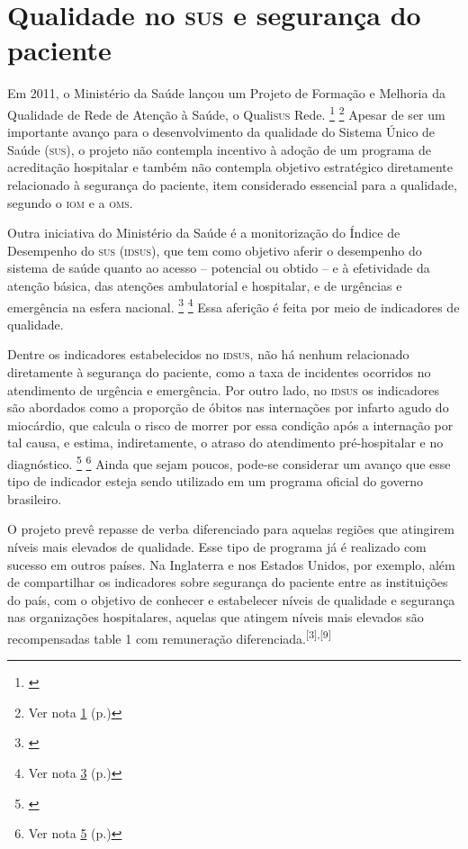 \documentclass{article}
\newcounter{fn1}
\newcounter{fn2}
\newcounter{fn3}
\newcounter{fn4}
\newcounter{fn5}
\newcounter{fn6}
\newcounter{fn7}
\newcounter{fn8}
\begin{document}
\section{Qualidade no \textsc{sus} e segurança do paciente}

Em 2011, o Ministério da Saúde lançou um Projeto de Formação e Melhoria da
Qualidade de
Rede de Atenção à Saúde, o Quali\textsc{sus} Rede.%
		{\footnote{ \label{ftn:fn5}}}%
		{\footnote{Ver nota \ref{ftn:fn5} (p.\pageref{ftn:fn5})}}
Apesar de ser um importante avanço para o desenvolvimento da qualidade do
Sistema
Único de Saúde (\textsc{sus}), o projeto não contempla incentivo à adoção de um programa
de
acreditação hospitalar e também não contempla objetivo estratégico diretamente
relacionado à
segurança do paciente, item considerado essencial para a qualidade, segundo o
\textsc{iom} e a
\textsc{oms}.

Outra iniciativa do Ministério da Saúde é a monitorização do Índice de
Desempenho do \textsc{sus}
(\textsc{idsus}), que tem como objetivo aferir o desempenho do sistema de saúde quanto ao
acesso –
potencial ou obtido – e à efetividade da atenção básica, das atenções
ambulatorial e
hospitalar, e de urgências e emergência na esfera nacional.%
		{\footnote{ \label{ftn:fn6}}}%
		{\footnote{Ver nota \ref{ftn:fn6} (p.\pageref{ftn:fn6})}}
Essa aferição é feita por meio de indicadores de qualidade.

Dentre os indicadores estabelecidos no \textsc{idsus}, não há nenhum relacionado
diretamente à
segurança do paciente, como a taxa de incidentes ocorridos no atendimento de
urgência e
emergência. Por outro lado, no \textsc{idsus} os indicadores são abordados como a
proporção de óbitos
nas internações por infarto agudo do miocárdio, que calcula o risco de morrer
por essa
condição após a internação por tal causa, e estima, indiretamente, o atraso do
atendimento
pré-hospitalar e no diagnóstico.%
		{\footnote{ \label{ftn:fn4}}}%
		{\footnote{Ver nota \ref{ftn:fn4} (p.\pageref{ftn:fn4})}}
Ainda que sejam poucos, pode-se considerar um avanço que esse tipo de indicador
esteja sendo utilizado em um programa oficial do governo brasileiro.

O projeto prevê repasse de verba diferenciado para aquelas regiões que atingirem
níveis
mais elevados de qualidade. Esse tipo de programa já é realizado com sucesso em
outros
países. Na Inglaterra e nos Estados Unidos, por exemplo, além de compartilhar os
indicadores
sobre segurança do paciente entre as instituições do país, com o objetivo de
conhecer e
estabelecer níveis de qualidade e segurança nas organizações hospitalares,
aquelas que
atingem níveis mais elevados são recompensadas table 1 com remuneração
diferenciada.\textsuperscript{[}\textsuperscript{3}\textsuperscript{]}\textsuperscript{,}\textsuperscript{[}\textsuperscript{9}\textsuperscript{]}
\end{document}
